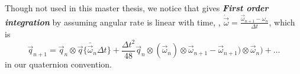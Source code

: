 Though not used in this master thesis, we notice that \cite{trawny2005indirect} gives \textbf{\textit{First order integration}} by assuming angular rate is linear with time, \ie, $\dot{\vec{\omega}} = \frac{\vec{\omega}_{n+1} - \omega_{n}}{\Delta{t}}$, which is
\begin{equation} \label{q44} 
	\vec{q}_{n+1} = \vec{q}_n \otimes \vec{q}\{ \bar{\vec{\omega}}_{n}\Delta{t} \} + \frac{\Delta{t}^2}{48}\vec{q}_n\otimes(\vec{\omega}_n) \otimes \vec{\omega}_{n+1} - \vec{\omega}_{n+1}) \otimes \vec{\omega}_{n}) + \dots
\end{equation}
in our quaternion convention.